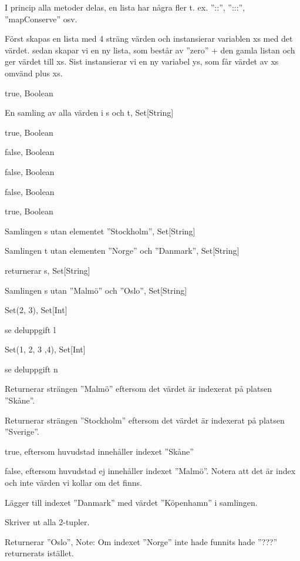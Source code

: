 \Task %

\Subtask
I princip alla metoder delas, en lista har några fler t. ex. ''::'', '':::'', ''mapConserve'' osv.

\Subtask
Först skapas en lista med 4 sträng värden och instansierar variablen xs med det värdet.
sedan skapar vi en ny lista, som består av ''zero'' + den gamla listan och ger värdet till xs.
Sist instansierar vi en ny variabel ys, som får värdet av xs omvänd plus xs.

\Task %

\Subtask
true, Boolean

\Subtask
En samling av alla värden i s och t, Set[String]

\Subtask
true, Boolean

\Subtask
false, Boolean

\Subtask
false, Boolean

\Subtask
false, Boolean

\Subtask
true, Boolean

\Subtask
Samlingen s utan elementet ''Stockholm'', Set[String]

\Subtask
Samlingen t utan elementen ''Norge'' och ''Danmark'', Set[String]

\Subtask
returnerar s, Set[String]

\Subtask
Samlingen s utan ''Malmö'' och ''Oslo'', Set[String]

\Subtask
Set(2, 3), Set[Int]

\Subtask
se deluppgift l

\Subtask
Set(1, 2, 3 ,4), Set[Int]

\Subtask
se deluppgift n

\Task %

\Subtask
Returnerar strängen ''Malmö'' eftersom det värdet är indexerat på platsen ''Skåne''.

\Subtask
Returnerar strängen ''Stockholm'' eftersom det värdet är indexerat på platsen ''Sverige''.

\Subtask
true, eftersom huvudstad innehåller indexet ''Skåne''

\Subtask
false, eftersom huvudstad ej innehåller indexet ''Malmö''. Notera att det är index och inte värden vi
kollar om det finns.

\Subtask
Lägger till indexet ''Danmark'' med värdet ''Köpenhamn'' i samlingen.

\Subtask
Skriver ut alla 2-tupler.

\Subtask
Returnerar ''Oslo'', Note: Om indexet ''Norge'' inte hade funnits hade ''???'' returnerats istället.

